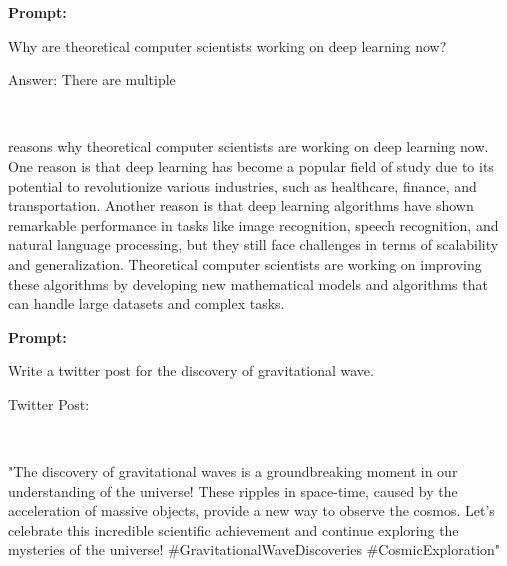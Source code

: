 \begin{AIbox}{}
\textbf{\color{purple}Prompt:}\\ \tt{\color{purple}\footnotesize Why are theoretical computer scientists working on deep learning now?

Answer: There are multiple}
\\
\begin{minipage}[t]{0.99\linewidth}
 reasons why theoretical computer scientists are working on deep learning now. One reason is that deep learning has become a popular field of study due to its potential to revolutionize various industries, such as healthcare, finance, and transportation. Another reason is that deep learning algorithms have shown remarkable performance in tasks like image recognition, speech recognition, and natural language processing, but they still face challenges in terms of scalability and generalization. Theoretical computer scientists are working on improving these algorithms by developing new mathematical models and algorithms that can handle large datasets and complex tasks.
\end{minipage}
\end{AIbox}

\begin{AIbox}{}
\textbf{\color{purple}Prompt:}\\ \tt{\color{purple}\footnotesize Write a twitter post for the discovery of gravitational wave.

Twitter Post:}
\\
\begin{minipage}[t]{0.99\linewidth}
 "The discovery of gravitational waves is a groundbreaking moment in our understanding of the universe! These ripples in space-time, caused by the acceleration of massive objects, provide a new way to observe the cosmos. Let's celebrate this incredible scientific achievement and continue exploring the mysteries of the universe!  \#GravitationalWaveDiscoveries \#CosmicExploration"
\end{minipage}
\end{AIbox}

